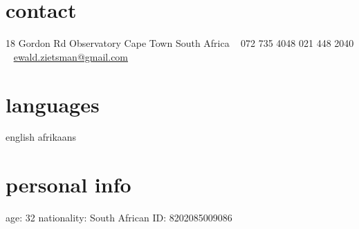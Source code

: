 \documentclass[]{friggeri-cv} %
\begin{document}


\begin{aside} %
\section{contact}
18 Gordon Rd
Observatory
Cape Town
South Africa
~
072 735 4048
021 448 2040
~
\href{mailto:ewald.zietsman@gmail.com}{ewald.zietsman@gmail.com}
\section{languages}
english 
afrikaans
\section{personal info}
age: 32
nationality: South African
ID: 8202085009086
\end{aside}
\end{document}
